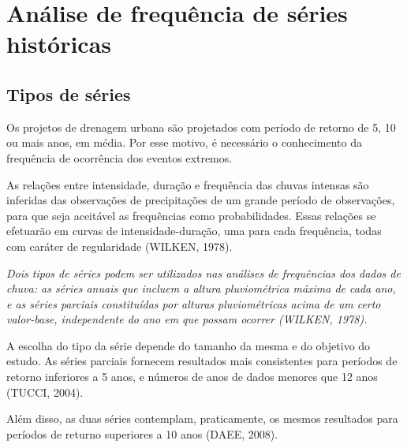 \section{Análise de frequência de séries históricas}

\subsection{Tipos de séries}

Os projetos de drenagem urbana são projetados com período de retorno de 5, 10 ou mais anos, em média. Por esse motivo, é necessário o conhecimento da frequência de ocorrência dos eventos extremos.

As relações entre intensidade, duração e frequência das chuvas intensas são inferidas das observações de precipitações de um grande período de observações, para que seja aceitável as frequências como probabilidades. Essas relações se efetuarão em curvas de intensidade-duração, uma para cada frequência, todas com caráter de regularidade (WILKEN, 1978).

\textit{Dois tipos de séries podem ser utilizados nas análises de frequências dos dados de chuva: as séries anuais que incluem a altura pluviométrica máxima de cada ano, e as séries parciais constituídas por alturas pluviométricas acima de um certo valor-base, independente do ano em que possam ocorrer (WILKEN, 1978).}

A escolha do tipo da série depende do tamanho da mesma e do objetivo do estudo. As séries parciais fornecem resultados mais consistentes para períodos de retorno inferiores a 5 anos, e números de anos de dados menores que 12 anos (TUCCI, 2004).

Além disso, as duas séries contemplam, praticamente, os mesmos resultados para períodos de returno superiores a 10 anos (DAEE, 2008).